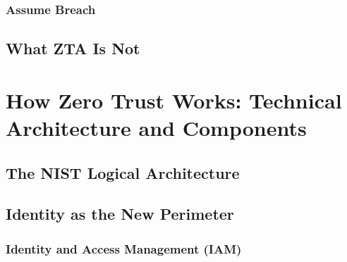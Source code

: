 \documentclass[12pt, letterpaper]{article}
\begin{document}
    \subsubsection{Assume Breach}

\subsection{What ZTA Is Not}

\section{How Zero Trust Works: Technical Architecture and Components}

\subsection{The NIST Logical Architecture}

\subsection{Identity as the New Perimeter}

    \subsubsection{Identity and Access Management (IAM)}
\end{document}
